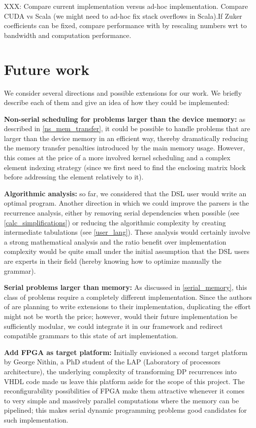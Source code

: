 {\color{red} XXX: Compare current implementation versus ad-hoc implementation. Compare CUDA vs Scala (we might need to ad-hoc fix stack overflows in Scala).If Zuker coefficients can be fixed, compare performance with \cite{adp_gpu} by rescaling numbers wrt to bandwidth and computation performance.}

\section{Future work}
We consider several directions and possible extensions for our work. We briefly describe each of them and give an idea of how they could be implemented:\ol
\item \textbf{Non-serial scheduling for problems larger than the device memory:} as described in \ref{ns_mem_transfer}, it could be possible to handle problems that are larger than the device memory in an efficient way, thereby dramatically reducing the memory transfer penalties introduced by the main memory usage. However, this comes at the price of a more involved kernel scheduling and a complex element indexing strategy (since we first need to find the enclosing matrix block before addressing the element relatively to it).
\item \textbf{Algorithmic analysis:} so far, we considered that the DSL user would write an optimal program. Another direction in which we could improve the parsers is the recurrence analysis, either by removing serial dependencies when possible (see \ref{calc_simplifications}) or reducing the algorithmic complexity by creating intermediate tabulations (see \ref{user_lang}). These analysis would certainly involve a strong mathematical analysis and the ratio benefit over implementation complexity would be quite small under the initial assumption that the DSL users are experts in their field (hereby knowing how to optimize manually the grammar). 
\item \textbf{Serial problems larger than memory:} As discussed in \ref{serial_memory}, this class of problems require a completely different implementation. Since the authors of \cite{swat_mega} are planning to write extensions to their implementation, duplicating the effort might not be worth the price; however, would their future implementation be sufficiently modular, we could integrate it in our framework and redirect compatible grammars to this state of art implementation.
\item \textbf{Add FPGA as target platform:} Initially envisioned a second target platform by George Nithin, a PhD student of the LAP (Laboratory of processors architecture), the underlying complexity of transforming DP recurrences into VHDL code made us leave this platform aside for the scope of this project. The reconfigurability possibilities of FPGA make them attractive whenever it comes to very simple and massively parallel computations where the memory can be pipelined; this makes serial dynamic programming problems good candidates for such implementation.
